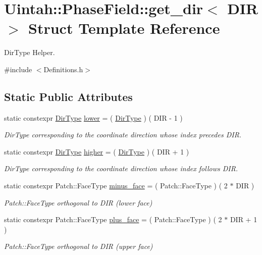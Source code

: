 \hypertarget{structUintah_1_1PhaseField_1_1get__dir}{}\section{Uintah\+:\+:Phase\+Field\+:\+:get\+\_\+dir$<$ D\+IR $>$ Struct Template Reference}
\label{structUintah_1_1PhaseField_1_1get__dir}


Dir\+Type Helper.  




{\ttfamily \#include $<$Definitions.\+h$>$}

\subsection*{Static Public Attributes}
\begin{DoxyCompactItemize}
\item 
static constexpr \hyperlink{namespaceUintah_1_1PhaseField_a94555da848596a419ae2c0e32649e1dc}{Dir\+Type} \hyperlink{structUintah_1_1PhaseField_1_1get__dir_a210b10609a865b8f542e78e0d2ba38b0}{lower} = ( \hyperlink{namespaceUintah_1_1PhaseField_a94555da848596a419ae2c0e32649e1dc}{Dir\+Type} ) ( D\+IR -\/ 1 )
\begin{DoxyCompactList}\small\item\em Dir\+Type corresponding to the coordinate direction whose index precedes D\+IR. \end{DoxyCompactList}\item 
static constexpr \hyperlink{namespaceUintah_1_1PhaseField_a94555da848596a419ae2c0e32649e1dc}{Dir\+Type} \hyperlink{structUintah_1_1PhaseField_1_1get__dir_a04063dff326643b6ca4262b753de1c8b}{higher} = ( \hyperlink{namespaceUintah_1_1PhaseField_a94555da848596a419ae2c0e32649e1dc}{Dir\+Type} ) ( D\+IR + 1 )
\begin{DoxyCompactList}\small\item\em Dir\+Type corresponding to the coordinate direction whose index follows D\+IR. \end{DoxyCompactList}\item 
static constexpr Patch\+::\+Face\+Type \hyperlink{structUintah_1_1PhaseField_1_1get__dir_ac1dfe53d61e67038a7784e8d7d1f0b1a}{minus\+\_\+face} = ( Patch\+::\+Face\+Type ) ( 2 $\ast$ D\+IR )
\begin{DoxyCompactList}\small\item\em Patch\+::\+Face\+Type orthogonal to D\+IR (lower face) \end{DoxyCompactList}\item 
static constexpr Patch\+::\+Face\+Type \hyperlink{structUintah_1_1PhaseField_1_1get__dir_ac765716f79e2b699e4fb5a7434c8612f}{plus\+\_\+face} = ( Patch\+::\+Face\+Type ) ( 2 $\ast$ D\+IR + 1 )
\begin{DoxyCompactList}\small\item\em Patch\+::\+Face\+Type orthogonal to D\+IR (upper face) \end{DoxyCompactList}\end{DoxyCompactItemize}


